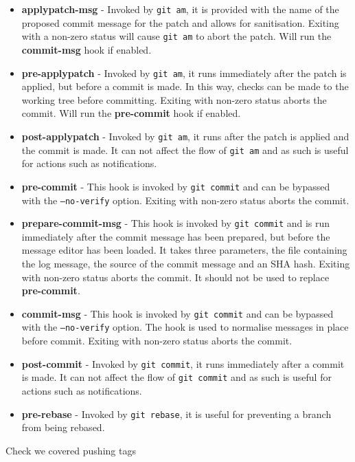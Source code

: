 \begin{itemize}
\item\textbf{applypatch-msg} - Invoked by \texttt{git am}, it is provided with the name of the proposed commit message for the patch and allows for sanitisation.
Exiting with a non-zero status will cause \texttt{git am} to abort the patch.
Will run the \textbf{commit-msg} hook if enabled.
\item\textbf{pre-applypatch} - Invoked by \texttt{git am}, it runs immediately after the patch is applied, but before a commit is made.
In this way, checks can be made to the working tree before committing.
Exiting with non-zero status aborts the commit.
Will run the \textbf{pre-commit} hook if enabled.
\item\textbf{post-applypatch} - Invoked by \texttt{git am}, it runs after the patch is applied and the commit is made.
It can not affect the flow of \texttt{git am} and as such is useful for actions such as notifications.
\item\textbf{pre-commit} - This hook is invoked by \texttt{git commit} and can be bypassed with the \texttt{--no-verify} option.
Exiting with non-zero status aborts the commit.
\item\textbf{prepare-commit-msg} - This hook is invoked by \texttt{git commit} and is run immediately after the commit message has been prepared, but before the message editor has been loaded.
It takes three parameters, the file containing the log message, the source of the commit message and an SHA hash.
Exiting with non-zero status aborts the commit.
It should not be used to replace \textbf{pre-commit}.
\item\textbf{commit-msg} - This hook is invoked by \texttt{git commit} and can be bypassed with the \texttt{--no-verify} option.
The hook is used to normalise messages in place before commit.
Exiting with non-zero status aborts the commit.
\item\textbf{post-commit} - Invoked by \texttt{git commit}, it runs immediately after a commit is made.
It can not affect the flow of \texttt{git commit} and as such is useful for actions such as notifications.
\item\textbf{pre-rebase} - Invoked by \texttt{git rebase}, it is useful for preventing a branch from being rebased.
\end{itemize}



Check we covered 
pushing tags
